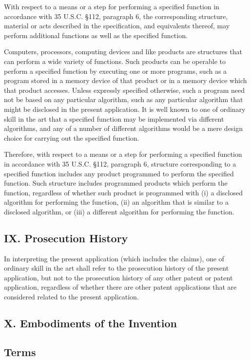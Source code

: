 \documentclass[11pt,a4paper]{article}
\begin{document}
With respect to a means or a step for performing a specified function in accordance with 35 U.S.C. §112, paragraph 6, the corresponding structure, material or acts described in the specification, and equivalents thereof, may perform additional functions as well as the specified function.

Computers, processors, computing devices and like products are structures that can perform a wide variety of functions. Such products can be operable to perform a specified function by executing one or more programs, such as a program stored in a memory device of that product or in a memory device which that product accesses. Unless expressly specified otherwise, such a program need not be based on any particular algorithm, such as any particular algorithm that might be disclosed in the present application. It is well known to one of ordinary skill in the art that a specified function may be implemented via different algorithms, and any of a number of different algorithms would be a mere design choice for carrying out the specified function.

Therefore, with respect to a means or a step for performing a specified function in accordance with 35 U.S.C. §112, paragraph 6, structure corresponding to a specified function includes any product programmed to perform the specified function. Such structure includes programmed products which perform the function, regardless of whether such product is programmed with (i) a disclosed algorithm for performing the function, (ii) an algorithm that is similar to a disclosed algorithm, or (iii) a different algorithm for performing the function.

\subsection{IX. Prosecution History}

In interpreting the present application (which includes the claims), one of ordinary skill in the art shall refer to the prosecution history of the present application, but not to the prosecution history of any other patent or patent application, regardless of whether there are other patent applications that are considered related to the present application.

\subsection{X. Embodiments of the Invention}

\subsection{Terms}
\end{document}
